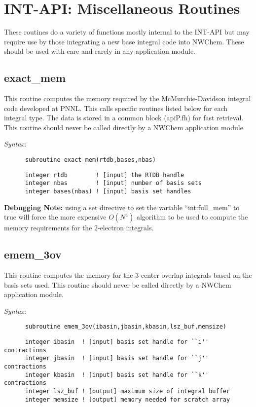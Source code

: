 \section{INT-API: Miscellaneous Routines} 
These routines do a variety of functions mostly internal to the 
INT-API but may require use by those integrating a new base integral 
code into NWChem.  These should be used with care and rarely in any 
application module.  
% 
 
\subsection{exact\_mem} 
This routine computes the memory required by the  
McMurchie-Davidson integral code developed at PNNL.   
This calls specific routines listed below for each  
integral type.  The data is stored in a common block  
(apiP.fh) for fast retrieval. 
This routine should never be called directly by a  
NWChem application module. 
    
{\it Syntax:} 
\begin{verbatim} 
      subroutine exact_mem(rtdb,bases,nbas) 
\end{verbatim} 
\begin{verbatim} 
      integer rtdb        ! [input] the RTDB handle 
      integer nbas        ! [input] number of basis sets 
      integer bases(nbas) ! [input] basis set handles 
\end{verbatim} 
 
{\bf Debugging Note:} using a set directive to set the  
variable ``int:full\_mem'' to true will force the more  
expensive $O(N^4)$ algorithm to be used to compute the  
memory requirements for the 2-electron integrals. 
 
\subsection{emem\_3ov} 
This routine computes the memory for the 3-center overlap  
integrals based on the basis sets used.   
This routine should never be called directly by a  
NWChem application module. 
 
{\it Syntax:} 
\begin{verbatim} 
      subroutine emem_3ov(ibasin,jbasin,kbasin,lsz_buf,memsize) 
\end{verbatim} 
\begin{verbatim} 
      integer ibasin  ! [input] basis set handle for ``i'' contractions 
      integer jbasin  ! [input] basis set handle for ``j'' contractions 
      integer kbasin  ! [input] basis set handle for ``k'' contractions 
      integer lsz_buf ! [output] maximum size of integral buffer  
      integer memsize ! [output] memory needed for scratch array 
\end{verbatim} 
